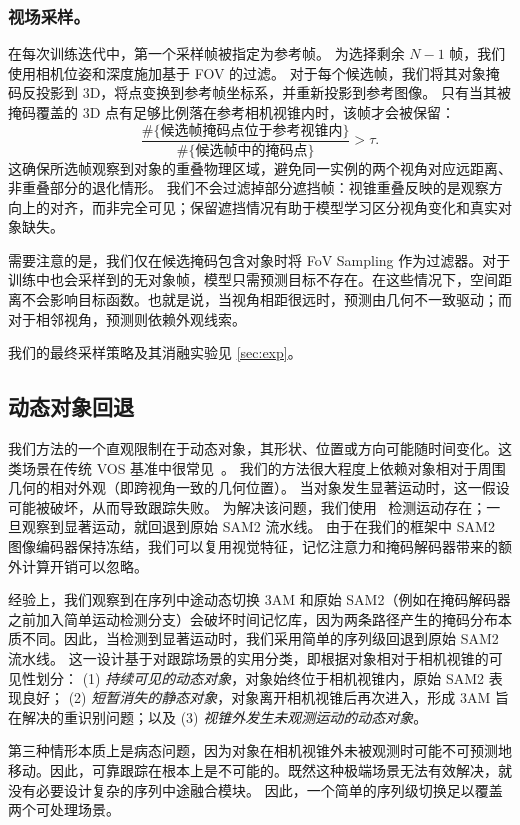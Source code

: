 \vspace{-1em}
\subsubsection{视场采样。}
在每次训练迭代中，第一个采样帧被指定为参考帧。
为选择剩余 $N\!-\!1$ 帧，我们使用相机位姿和深度施加基于 FOV 的过滤。
对于每个候选帧，我们将其对象掩码反投影到 3D，将点变换到参考帧坐标系，并重新投影到参考图像。
只有当其被掩码覆盖的 3D 点有足够比例落在参考相机视锥内时，该帧才会被保留：
\[
\frac{\#\{\text{候选帧掩码点位于参考视锥内}\}}
       {\#\{\text{候选帧中的掩码点}\}}
> \tau.
\]
这确保所选帧观察到对象的重叠物理区域，避免同一实例的两个视角对应远距离、非重叠部分的退化情形。
我们不会过滤掉部分遮挡帧：视锥重叠反映的是观察方向上的对齐，而非完全可见；保留遮挡情况有助于模型学习区分视角变化和真实对象缺失。

需要注意的是，我们仅在候选掩码包含对象时将 FoV Sampling 作为过滤器。对于训练中也会采样到的无对象帧，模型只需预测目标不存在。在这些情况下，空间距离不会影响目标函数。也就是说，当视角相距很远时，预测由几何不一致驱动；而对于相邻视角，预测则依赖外观线索。

我们的最终采样策略及其消融实验见 \cref{sec:exp}。

\vspace{-0.5em}
\subsection{动态对象回退}
\vspace{-0.5em}
我们方法的一个直观限制在于动态对象，其形状、位置或方向可能随时间变化。这类场景在传统 VOS 基准中很常见~\cite{perazzi2017davis, xu2018youtube, fan2019lasot}。
我们的方法很大程度上依赖对象相对于周围几何的相对外观（即跨视角一致的几何位置）。
当对象发生显著运动时，这一假设可能被破坏，从而导致跟踪失败。
为解决该问题，我们使用~\cite{Huang_2025_seganymotion} 检测运动存在；一旦观察到显著运动，就回退到原始 SAM2 流水线。
由于在我们的框架中 SAM2 图像编码器保持冻结，我们可以复用视觉特征，记忆注意力和掩码解码器带来的额外计算开销可以忽略。

经验上，我们观察到在序列中途动态切换 3AM 和原始 SAM2（例如在掩码解码器之前加入简单运动检测分支）会破坏时间记忆库，因为两条路径产生的掩码分布本质不同。因此，当检测到显著运动时，我们采用简单的序列级回退到原始 SAM2 流水线。
这一设计基于对跟踪场景的实用分类，即根据对象相对于相机视锥的可见性划分：
(1) \textit{持续可见的动态对象}，对象始终位于相机视锥内，原始 SAM2 表现良好；
(2) \textit{短暂消失的静态对象}，对象离开相机视锥后再次进入，形成 3AM 旨在解决的重识别问题；以及
(3) \textit{视锥外发生未观测运动的动态对象}。

第三种情形本质上是病态问题，因为对象在相机视锥外未被观测时可能不可预测地移动。因此，可靠跟踪在根本上是不可能的。既然这种极端场景无法有效解决，就没有必要设计复杂的序列中途融合模块。
因此，一个简单的序列级切换足以覆盖两个可处理场景。
